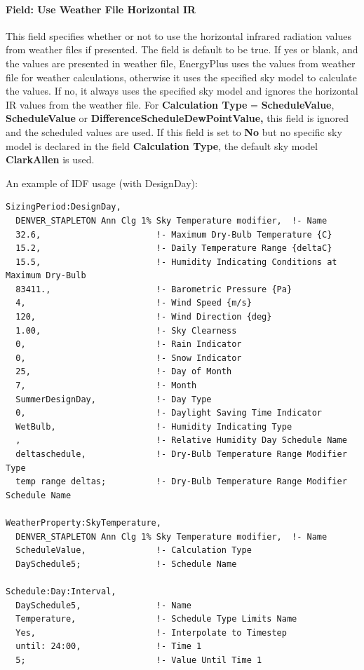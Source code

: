 \paragraph{Field: Use Weather File Horizontal IR}\label{field-use-weather-file-hori-ir}

This field specifies whether or not to use the horizontal infrared radiation values from weather files if presented. The field is default to be true. If yes or blank, and the values are presented in weather file, EnergyPlus uses the values from weather file for weather calculations, otherwise it uses the specified sky model to calculate the values. If no, it always uses the specified sky model and ignores the horizontal IR values from the weather file. For \textbf{Calculation Type} = \textbf{ScheduleValue}, \textbf{ScheduleValue} or \textbf{DifferenceScheduleDewPointValue,} this field is ignored and the scheduled values are used. If this field is set to \textbf{No} but no specific sky model is declared in the field \textbf{Calculation Type}, the default sky model \textbf{ClarkAllen} is used.

An example of IDF usage (with DesignDay):

\begin{lstlisting}
SizingPeriod:DesignDay,
  DENVER_STAPLETON Ann Clg 1% Sky Temperature modifier,  !- Name
  32.6,                       !- Maximum Dry-Bulb Temperature {C}
  15.2,                       !- Daily Temperature Range {deltaC}
  15.5,                       !- Humidity Indicating Conditions at Maximum Dry-Bulb
  83411.,                     !- Barometric Pressure {Pa}
  4,                          !- Wind Speed {m/s}
  120,                        !- Wind Direction {deg}
  1.00,                       !- Sky Clearness
  0,                          !- Rain Indicator
  0,                          !- Snow Indicator
  25,                         !- Day of Month
  7,                          !- Month
  SummerDesignDay,            !- Day Type
  0,                          !- Daylight Saving Time Indicator
  WetBulb,                    !- Humidity Indicating Type
  ,                           !- Relative Humidity Day Schedule Name
  deltaschedule,              !- Dry-Bulb Temperature Range Modifier Type
  temp range deltas;          !- Dry-Bulb Temperature Range Modifier Schedule Name

WeatherProperty:SkyTemperature,
  DENVER_STAPLETON Ann Clg 1% Sky Temperature modifier,  !- Name
  ScheduleValue,              !- Calculation Type
  DaySchedule5;               !- Schedule Name

Schedule:Day:Interval,
  DaySchedule5,               !- Name
  Temperature,                !- Schedule Type Limits Name
  Yes,                        !- Interpolate to Timestep
  until: 24:00,               !- Time 1
  5;                          !- Value Until Time 1
\end{lstlisting}

